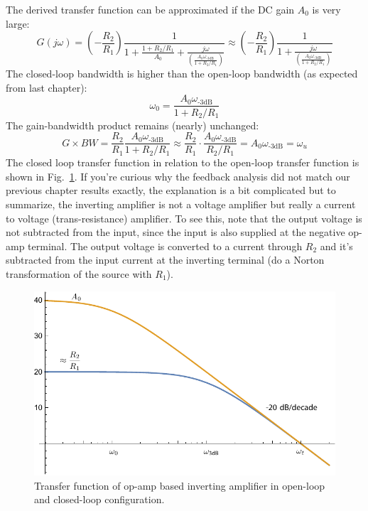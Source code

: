 The derived transfer function can be approximated if the DC gain $A_0$ is very large:
%
\begin{equation}
  G(j\omega) = \left(-\frac{R_2}{R_1}\right)  \frac{1}{1 + \frac{1+R_2/R_1}{A_0} + 
    \frac{j\omega}{\left( \frac{A_0 \omega_\text{-3dB}}{1 + R_2/R_1} \right)}} \approx
     \left(-\frac{R_2}{R_1}\right)\frac{1}{1 + \frac{j\omega}{\left( \frac{A_0 \omega_\text{-3dB}}{1 + R_2/R_1} \right)}}
\end{equation}
%
The closed-loop bandwidth is higher than the open-loop bandwidth (as expected from last chapter):
%  
\begin{equation} 
	\omega_{0} = \frac{A_0 \omega_{\text{-3dB}}}{ 1 + R_2/R_1} 
\end{equation}
%
The gain-bandwidth product remains (nearly) unchanged:
%
\begin{equation} 
	G \times BW = \frac{R_2}{R_1} \frac{A_0 \omega_\text{-3dB}}{ 1 + R_2/R_1} \approx \frac{R_2}{R_1}
    \cdot \frac{A_0 \omega_\text{-3dB}}{R_2/R_1} = A_0 \omega_\text{-3dB} = \omega_u
\end{equation}
%
The closed loop transfer function in relation to the open-loop transfer function is shown in Fig.~\ref{fig:mag1pole_fb_label}.  If you're curious why the feedback analysis did not match our previous chapter results exactly, the explanation is a bit complicated but to summarize, the inverting amplifier is not a voltage amplifier but really a current to voltage (trans-resistance) amplifier.  To see this, note that the output voltage is not subtracted from the input, since the input is also supplied at the negative op-amp terminal. The output voltage is converted to a current through $R_2$ and it's subtracted from the input current at the inverting terminal (do a Norton transformation of the source with $R_1$).



\begin{figure}[tb]
\begin{center}
\includegraphics[scale=1]{mag1pole_fb_label}
\end{center}
\caption{Transfer function of op-amp based inverting amplifier in open-loop and closed-loop configuration.} \label{fig:mag1pole_fb_label}
\end{figure}






